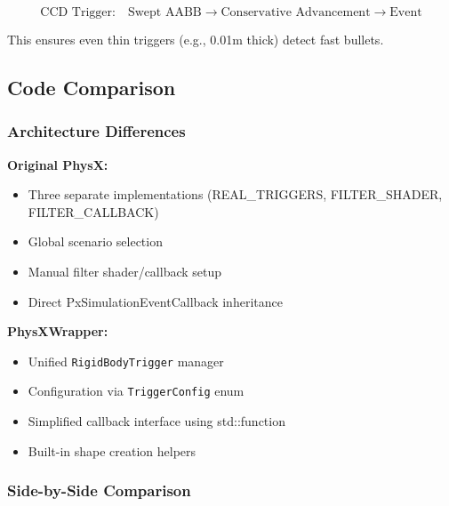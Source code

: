 \begin{equation}
\text{CCD Trigger:} \quad \text{Swept AABB} \rightarrow \text{Conservative Advancement} \rightarrow \text{Event}
\end{equation}

This ensures even thin triggers (e.g., 0.01m thick) detect fast bullets.


\subsection{Code Comparison}

\subsubsection{Architecture Differences}

\textbf{Original PhysX:}
\begin{itemize}
    \item Three separate implementations (REAL\_TRIGGERS, FILTER\_SHADER, FILTER\_CALLBACK)
    \item Global scenario selection
    \item Manual filter shader/callback setup
    \item Direct PxSimulationEventCallback inheritance
\end{itemize}

\textbf{PhysXWrapper:}
\begin{itemize}
    \item Unified \texttt{RigidBodyTrigger} manager
    \item Configuration via \texttt{TriggerConfig} enum
    \item Simplified callback interface using std::function
    \item Built-in shape creation helpers
\end{itemize}

\subsubsection{Side-by-Side Comparison}

